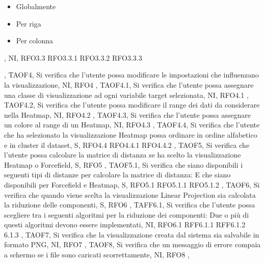 {{{\begin{itemize}
                \item Globalmente
                \item Per riga
                \item Per colonna
            \end{itemize}},
            NI,
            RFO3.3 RFO3.3.1 RFO3.3.2 RFO3.3.3
        },
        {   
            TAOF4,
            Si verifica che l'utente possa modificare le impostazioni che influenzano la visualizzazione,
            NI,
            RFO4
        },
        {   
            TAOF4.1,
            Si verifica che l'utente possa assegnare una classe di visualizzazione ad ogni variabile target selezionata,
            NI,
            RFO4.1
        },
        {   
            TAOF4.2,
            Si verifica che l'utente possa modificare il range dei dati da considerare nella Heatmap,
            NI,
            RFO4.2
        },
        {   
            TAOF4.3,
            Si verifica che l'utente possa assegnare un colore al range di un Heatmap,
            NI,
            RFO4.3
        },
        {   
            TAOF4.4,
            Si verifica che l'utente che ha selezionato la visualizzazione Heatmap possa ordinare in ordine alfabetico e in cluster il dataset,
            S,
            RFO4.4 RFO4.4.1 RFO4.4.2
        },
        {   
            TAOF5,
            Si verifica che l'utente possa calcolare la matrice di distanza se ha scelto la visualizzazione Heatmap o Forcefield,
            S,
            RFO5
        },    
        {   
            TAOF5.1,
            Si verifica che siano disponibili i seguenti tipi di distanze per calcolare la matrice di distanza:
            E che siano disponibili per Forcefield e Heatmap,
            S,
            RFO5.1 RFO5.1.1 RFO5.1.2
        },
        {   
            TAOF6,
            Si verifica che quando viene scelta la visualizzazione Linear Projection sia calcolata la riduzione delle componenti,
            S,
            RFO6
        },
        {   
            TAFF6.1,
            Si verifica che l'utente possa scegliere tra i seguenti algoritmi per la riduzione dei componenti:
            Due o più di questi algoritmi devono essere implementati,
            NI,
            RFO6.1 RFF6.1.1 RFF6.1.2 6.1.3
        },
        {   
            TAOF7,
            Si verifica che la visualizzazione creata dal sistema sia salvabile in formato PNG,
            NI,
            RFO7
        },
        {   
            TAOF8,
            Si verifica che un messaggio di errore compaia a schermo se i file sono caricati scorrettamente,
            NI,
            RFO8
        },
        }
